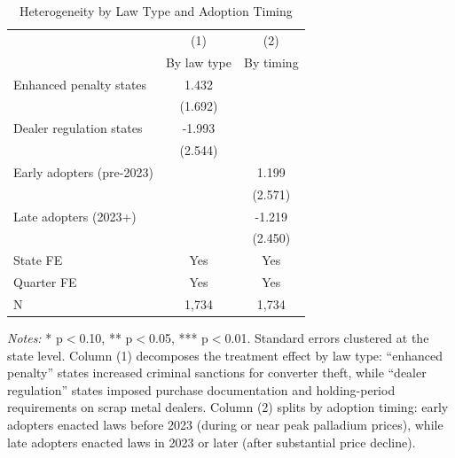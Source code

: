\begin{table}[H]
\centering
\caption{Heterogeneity by Law Type and Adoption Timing}
\begin{threeparttable}
\begin{tabular}{lcc}
\toprule
& (1) & (2) \\
& By law type & By timing \\
\midrule
Enhanced penalty states & 1.432 & \\
& (1.692) & \\
Dealer regulation states & -1.993 & \\
& (2.544) & \\[6pt]
Early adopters (pre-2023) & & 1.199 \\
& & (2.571) \\
Late adopters (2023+) & & -1.219 \\
& & (2.450) \\
\midrule
State FE & Yes & Yes \\
Quarter FE & Yes & Yes \\
N & 1,734 & 1,734 \\
\bottomrule
\end{tabular}
\begin{tablenotes}[flushleft]
\small
\item \textit{Notes:} * p$<$0.10, ** p$<$0.05, *** p$<$0.01. Standard errors clustered at the state level. Column (1) decomposes the treatment effect by law type: ``enhanced penalty'' states increased criminal sanctions for converter theft, while ``dealer regulation'' states imposed purchase documentation and holding-period requirements on scrap metal dealers. Column (2) splits by adoption timing: early adopters enacted laws before 2023 (during or near peak palladium prices), while late adopters enacted laws in 2023 or later (after substantial price decline).
\end{tablenotes}
\end{threeparttable}
\label{tab:het}
\end{table}
